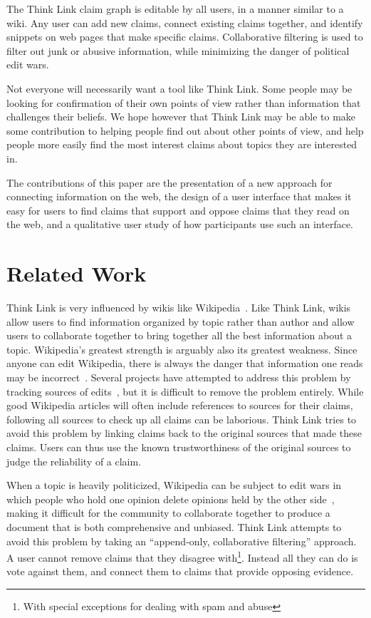 \documentclass{chi2009}
\begin{document}
The Think Link claim graph is editable by all users, in a manner similar to a wiki. Any user can add new claims, connect existing claims together, and identify snippets on web pages that make specific claims. Collaborative filtering is used to filter out junk or abusive information, while minimizing the danger of political edit wars.

Not everyone will necessarily want a tool like Think Link. Some people may be looking for confirmation of their own points of view rather than information that challenges their beliefs. We hope however that Think Link may be able to make some contribution to helping people find out about other points of view, and help people more easily find the most interest claims about topics they are interested in.

The contributions of this paper are the presentation of a new approach for connecting information on the web, the design of a user interface that makes it easy for users to find claims that support and oppose claims that they read on the web, and a qualitative user study of how participants use such an interface.


\section{Related Work}

Think Link is very influenced by wikis like Wikipedia~\cite{wikipedia}. Like Think Link, wikis allow users to find information organized by topic rather than author and allow users to collaborate together to bring together all the best information about a topic. Wikipedia's greatest strength is arguably also its greatest weakness. Since anyone can edit Wikipedia, there is always the danger that information one reads may be incorrect~\cite{wikifalse}. Several projects have attempted to address this problem by tracking sources of edits~\cite{wikicorrect,wikicorrect2,wikicorrect3}, but it is difficult to remove the problem entirely. While good Wikipedia articles will often include references to sources for their claims, following all sources to check up all claims can be laborious. Think Link tries to avoid this problem by linking claims back to the original sources that made these claims. Users can thus use the known trustworthiness of the original sources to judge the reliability of a claim. 

When a topic is heavily politicized, Wikipedia can be subject to edit wars in which people who hold one opinion delete opinions held by the other side~\cite{wikicorrect3}, making it difficult for the community to collaborate together to produce a document that is both comprehensive and unbiased. Think Link attempts to avoid this problem by taking an ``append-only, collaborative filtering'' approach. A user cannot remove claims that they disagree with\footnote{With special exceptions for dealing with spam and abuse}. Instead all they can do is vote against them, and connect them to claims that provide opposing evidence.
\end{document}
